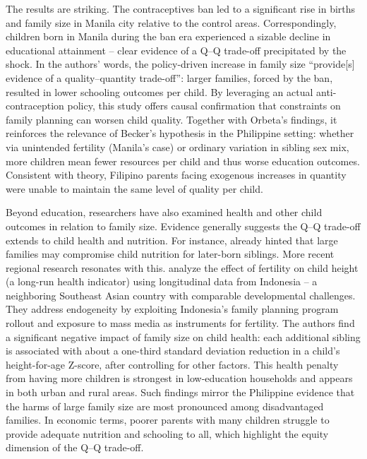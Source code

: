 \documentclass[]{AEA}
\begin{document}
The results are striking. The contraceptives ban led to a significant
rise in births and family size in Manila city relative to the control
areas. Correspondingly, children born in Manila during the ban era
experienced a sizable decline in educational attainment -- clear
evidence of a Q--Q trade-off precipitated by the shock. In the authors'
words, the policy-driven increase in family size ``provide{[}s{]}
evidence of a quality--quantity trade-off'': larger families, forced by
the ban, resulted in lower schooling outcomes per child. By leveraging
an actual anti-contraception policy, this study offers causal
confirmation that constraints on family planning can worsen child
quality. Together with Orbeta's findings, it reinforces the relevance of
Becker's hypothesis in the Philippine setting: whether via unintended
fertility (Manila's case) or ordinary variation in sibling sex mix, more
children mean fewer resources per child and thus worse education
outcomes. Consistent with theory, Filipino parents facing exogenous
increases in quantity were unable to maintain the same level of quality
per child.

Beyond education, researchers have also examined health and other child
outcomes in relation to family size. Evidence generally suggests the
Q--Q trade-off extends to child health and nutrition. For instance,
\citet{horton1986child} already hinted that large families may
compromise child nutrition for later-born siblings. More recent regional
research resonates with this. \citet{hatton2018fertility} analyze the
effect of fertility on child height (a long-run health indicator) using
longitudinal data from Indonesia -- a neighboring Southeast Asian
country with comparable developmental challenges. They address
endogeneity by exploiting Indonesia's family planning program rollout
and exposure to mass media as instruments for fertility. The authors
find a significant negative impact of family size on child health: each
additional sibling is associated with about a one-third standard
deviation reduction in a child's height-for-age Z-score, after
controlling for other factors. This health penalty from having more
children is strongest in low-education households and appears in both
urban and rural areas. Such findings mirror the Philippine evidence that
the harms of large family size are most pronounced among disadvantaged
families. In economic terms, poorer parents with many children struggle
to provide adequate nutrition and schooling to all, which highlight the
equity dimension of the Q--Q trade-off.
\end{document}
